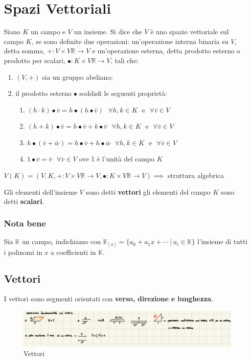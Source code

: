 \documentclass[../main.tex]{subfiles}
\begin{document}
\section{Spazi Vettoriali}
Siano $K$ un campo e $V$ un insieme. Si dice che $V$ è uno spazio vettoriale
sul campo $K$, se sono definite due operazioni: un’operazione interna binaria
su $V$, detta somma, $+: V \times V \mathbb{R}\rightarrow V$ e un’operazione
esterna, detta prodotto esterno o prodotto per scalari, $\bullet : K \times V
    \mathbb{R}\rightarrow V$, tali che:

\begin{enumerate}
    \item $(V, +)$ sia un gruppo abeliano;
    \item il prodotto esterno $\bullet$ soddisfi le seguenti proprietà:
          \begin{enumerate}
              \item $(h\cdot k)\bullet \bar{v} = h\bullet(h\bullet \bar{v}) \ \ \ \forall h,k \in K \ \ \ \text{e} \ \ \ \forall \bar{v} \in V$
              \item $(h+ k)\bullet \bar{v} = h\bullet \bar{v}+k\bullet \bar{v} \ \ \ \forall h,k \in K \ \ \ \text{e} \ \ \ \forall \bar{v} \in V$
              \item $h\bullet(\bar{v}+\bar{w}) = h\bullet\bar{v}+h\bullet\bar{w} \ \ \ \forall h,k \in K \ \ \ \text{e} \ \ \ \forall \bar{v} \in V$
              \item $1\bullet \bar{v} = \bar{v} \ \ \ \forall \bar{v} \in V$ ove 1 è l’unità del campo $K$
          \end{enumerate}
\end{enumerate}

$V(K) = (V, K, +:V\times V\mathbb{R}\rightarrow V, \bullet:K\times V\mathbb{R}\rightarrow V) \implies$ struttura algebrica

Gli elementi dell’insieme $V$ sono detti \textbf{vettori} gli elementi del
campo $K$ sono detti \textbf{scalari}.

\subsubsection{Nota bene}
Sia $\mathbb K$ un campo, indichiamo con $\mathbb K_{[x]}=\{a_0+a_1x+\cdots \ |
    \ a_i\in\mathbb K\}$ l'insieme di tutti i polinomi in $x$ a coefficienti in
$\mathbb K$.

\subsection{Vettori}
I vettori sono segmenti orientati con \textbf{verso, direzione e lunghezza}.
\begin{figure}[ht]
    \centering
    \includegraphics[width=1\linewidth]{image.png}
    \caption{Vettori}\label{fig:enter-label}
\end{figure}
\end{document}
